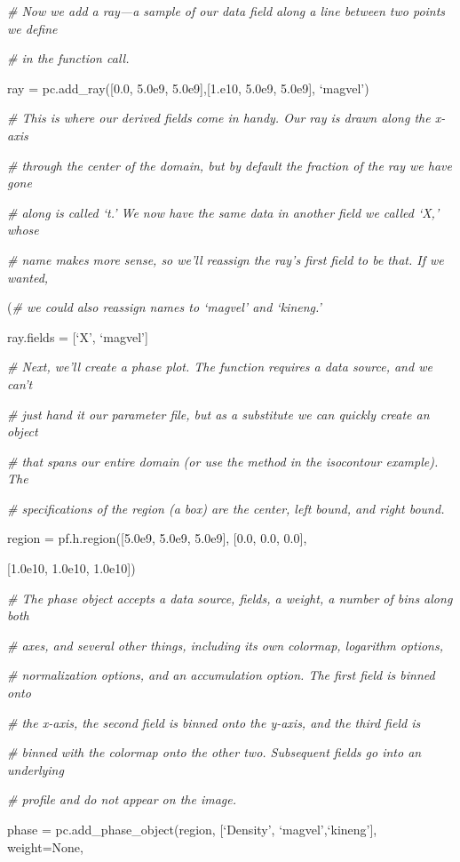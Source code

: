 {\it\# Now we add a ray---a sample of our data field along a line between two points we define}
{\setlength{\parskip}{0pt}

{\it\# in the function call.}

ray = pc.add\_ray([0.0, 5.0e9, 5.0e9],[1.e10, 5.0e9, 5.0e9], `magvel')
}

{\it\# This is where our derived fields come in handy. Our ray is drawn along the x-axis}
{\setlength{\parskip}{0pt}

{\it\# through the center of the domain, but by default the fraction of the ray we have gone}

{\it\# along is called `t.' We now have the same data in another field we called `X,' whose}

{\it\# name makes more sense, so we'll reassign the ray's first field to be that. If we wanted,}

(\it\# we could also reassign names to `magvel' and `kineng.'

ray.fields = [`X', `magvel']
}

{\it\# Next, we'll create a phase plot. The function requires a data source, and we can't}
{\setlength{\parskip}{0pt}

{\it\# just hand it our parameter file, but as a substitute we can quickly create an object}

{\it\# that spans our entire domain (or use the method in the isocontour example). The}

{\it\#  specifications of the region (a box) are the center, left bound, and right bound.}

region = pf.h.region([5.0e9, 5.0e9, 5.0e9], [0.0, 0.0, 0.0],
}

{\setlength{\parindent}{100pt}[1.0e10, 1.0e10, 1.0e10])}

{\it\# The phase object accepts a data source, fields, a weight, a number of bins along both}
{\setlength{\parskip}{0pt}

{\it\# axes, and several other things, including its own colormap, logarithm options,}

{\it\# normalization options, and an accumulation option. The first field is binned onto}

{\it\# the x-axis, the second field is binned onto the y-axis, and the third field is}

{\it\# binned with the colormap onto the other two. Subsequent fields go into an underlying}

{\it\# profile and do not appear on the image.}

phase = pc.add\_phase\_object(region, [`Density', `magvel',`kineng'], weight=None,
}

